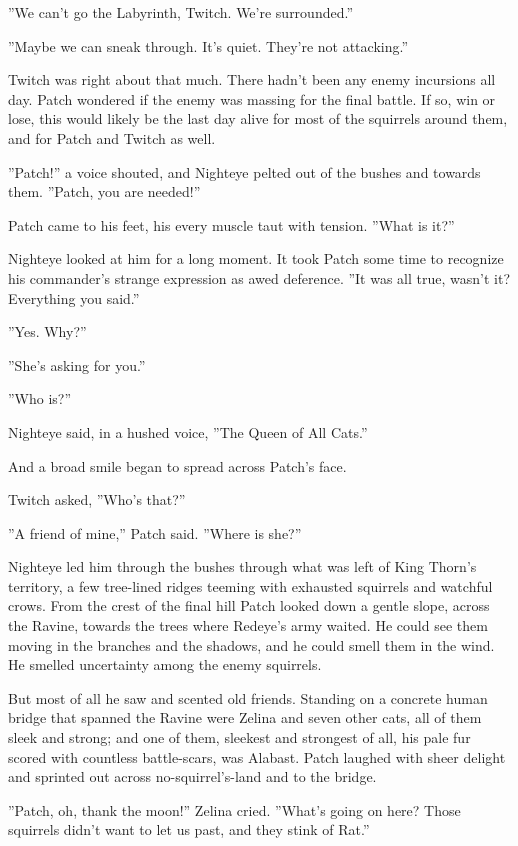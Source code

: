 \documentclass[12pt]{book}
\begin{document}
''We can't go the Labyrinth, Twitch. We're surrounded.''

''Maybe we can sneak through. It's quiet. They're not attacking.''

Twitch was right about that much. There hadn't been any enemy incursions all day. Patch wondered if the enemy was massing for the final battle. If so, win or lose, this would likely be the last day alive for most of the squirrels around them, and for Patch and Twitch as well.

''Patch!'' a voice shouted, and Nighteye pelted out of the bushes and towards them. ''Patch, you are needed!''

Patch came to his feet, his every muscle taut with tension. ''What is it?''

Nighteye looked at him for a long moment. It took Patch some time to recognize his commander's strange expression as awed deference. ''It was all true, wasn't it? Everything you said.''

''Yes. Why?''

''She's asking for you.''

''Who is?''

Nighteye said, in a hushed voice, ''The Queen of All Cats.''

And a broad smile began to spread across Patch's face.

Twitch asked, ''Who's that?''

''A friend of mine,'' Patch said. ''Where is she?''

Nighteye led him through the bushes through what was left of King Thorn's territory, a few tree-lined ridges teeming with exhausted squirrels and watchful crows. From the crest of the final hill Patch looked down a gentle slope, across the Ravine, towards the trees where Redeye's army waited. He could see them moving in the branches and the shadows, and he could smell them in the wind. He smelled uncertainty among the enemy squirrels.

But most of all he saw and scented old friends. Standing on a concrete human bridge that spanned the Ravine were Zelina and seven other cats, all of them sleek and strong; and one of them, sleekest and strongest of all, his pale fur scored with countless battle-scars, was Alabast. Patch laughed with sheer delight and sprinted out across no-squirrel's-land and to the bridge.

''Patch, oh, thank the moon!'' Zelina cried. ''What's going on here? Those squirrels didn't want to let us past, and they stink of Rat.''
\end{document}
